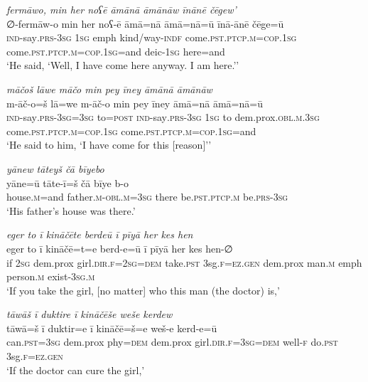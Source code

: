 \ea \label{ŽP.136}
\textit{fermāwo, min her noʕē āmānā āmānāw īnānē čēgew’} \\ 
\gll ∅-fermāw-o min her noʕ-ē āmā=nā āmā=nā=ū īnā-ānē čēge=ū \\ 
 \textsc{ind-}say\textsc{.prs}\textsc{-3sg} \textsc{1sg} emph kind/way\textsc{-indf} come\textsc{.pst}\textsc{.ptcp}\textsc{.m}\textsc{=cop}\textsc{.\textsc{1sg}} come\textsc{.pst}\textsc{.ptcp}\textsc{.m}\textsc{=cop}\textsc{.\textsc{1sg}}=and deic\textsc{-\textsc{1sg}} here=and \\ 
\glt `He said, ‘Well, I have come here anyway. I am here.’'
\z 
 
\ea \label{ŽP.138}
\textit{māčoš lāwe māčo min pey īney āmānā āmānāw} \\ 
\gll m-āč-o=š lā=we m-āč-o min pey īney āmā=nā āmā=nā=ū \\ 
 \textsc{ind-}say\textsc{.prs}\textsc{-3sg}\textsc{=3sg} to\textsc{=\textsc{post}} \textsc{ind-}say\textsc{.prs}\textsc{-3sg} \textsc{1sg} to dem.prox\textsc{.obl}\textsc{.m}\textsc{.3sg} come\textsc{.pst}\textsc{.ptcp}\textsc{.m}\textsc{=cop}\textsc{.\textsc{1sg}} come\textsc{.pst}\textsc{.ptcp}\textsc{.m}\textsc{=cop}\textsc{.\textsc{1sg}}=and \\ 
\glt `He said to him, ‘I have come for this [reason]’'
\z 
 
\ea \label{ŽP.142}
\textit{yānew tāteyš čā bīyebo} \\ 
\gll yāne=ū tāte-ī=š čā bīye b-o \\ 
 house\textsc{.m}=and father\textsc{.m}\textsc{-obl}\textsc{.m}\textsc{=3sg} there be\textsc{.pst}\textsc{.ptcp}\textsc{.m} be\textsc{.prs}\textsc{-3sg} \\ 
\glt `His father’s house was there.'
\z 
 
\ea \label{ŽP.163}
\textit{eger to ī kināčēte berdeū ī pīyā her kes hen} \\ 
\gll eger to ī kināčē=t=e berd-e=ū ī pīyā her kes hen-∅ \\ 
 if \textsc{2sg} dem.prox girl\textsc{.dir}\textsc{.f}\textsc{=\textsc{2sg}}\textsc{=dem} take\textsc{.pst} 3sg\textsc{.f}\textsc{\textsc{=ez.gen}} dem.prox man\textsc{.m} emph person\textsc{.m} exist\textsc{-3sg}\textsc{.m} \\ 
\glt `If you take the girl, [no matter] who this man (the doctor) is,'
\z 
 
\ea \label{ŽP.164}
\textit{tāwāš ī duktire ī kināčēše weše kerdew} \\ 
\gll tāwā=š ī duktir=e ī kināčē=š=e weš-e kerd-e=ū \\ 
 can\textsc{.pst}\textsc{=3sg} dem.prox phy\textsc{=dem} dem.prox girl\textsc{.dir}\textsc{.f}\textsc{=3sg}\textsc{=dem} well\textsc{-f} do\textsc{.pst} 3sg\textsc{.f}\textsc{\textsc{=ez.gen}} \\ 
\glt `If the doctor can cure the girl,'
\z 
 
